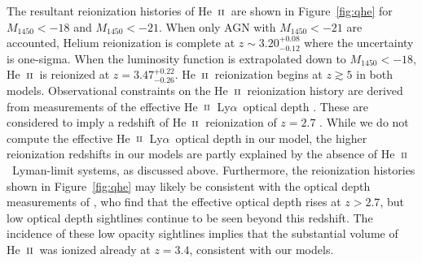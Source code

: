 \documentclass[fleqn,usenatbib]{mnras}
\def\lya{Ly$\alpha$~}
\def\HeII{\hbox{He~$\scriptstyle\rm II$}}
\begin{document}
The resultant reionization histories of \HeII\ are shown in
Figure~\ref{fig:qhe} for $M_\mathrm{1450}<-18$ and
$M_\mathrm{1450}<-21$.  When only AGN with $M_\mathrm{1450}<-21$ are
accounted, Helium reionization is complete at $z\sim
3.20^{+0.08}_{-0.12}$ where the uncertainty is one-sigma.  When the
luminosity function is extrapolated down to $M_\mathrm{1450}<-18$,
\HeII\ is reionized at $z=3.47^{+0.22}_{-0.26}$.  \HeII\ reionization
begins at $z\gtrsim 5$ in both models.  Observational constraints on
the \HeII\ reionization history are derived from measurements of the
effective \HeII\ \lya optical depth \citep{2001Sci...293.1112K,
  2004ApJ...600..570S, 2006A&A...455...91F, 2010ApJ...722.1312S,
  2011ApJ...733L..24W, 2016ApJ...825..144W}.  These are considered to
imply a redshift of \HeII\ reionization of $z=2.7$
\citep{2011ApJ...733L..24W}.  While we do not compute the effective
\HeII\ \lya optical depth in our model, the higher reionization
redshifts in our models are partly explained by the absence of
\HeII\ Lyman-limit systems, as discussed above.  Furthermore, the
reionization histories shown in Figure~\ref{fig:qhe} may likely be
consistent with the optical depth measurements of
\citet{2016ApJ...825..144W}, who find that the effective optical depth
rises at $z>2.7$, but low optical depth sightlines continue to be seen
beyond this redshift.  The incidence of these low opacity sightlines
implies that the substantial volume of \HeII\ was ionized already at
$z=3.4$, consistent with our models.
\end{document}

